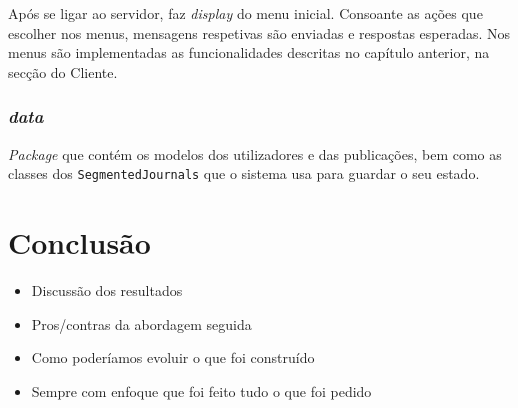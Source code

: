 \documentclass[12pt, a4paper]{report}
\begin{document}
Após se ligar ao servidor, faz \textit{display} do menu inicial.
Consoante as ações que escolher nos menus, mensagens respetivas são enviadas e respostas esperadas.
Nos menus são implementadas as funcionalidades descritas no capítulo anterior, na secção do Cliente.


\subsection{\textit{data}}
\textit{Package} que contém os modelos dos utilizadores e das publicações, bem como as classes dos \texttt{SegmentedJournals} que o sistema usa para guardar o seu estado.


\chapter{Conclusão}
\begin{itemize}
    \item Discussão dos resultados
    \item Pros/contras da abordagem seguida
    \item Como poderíamos evoluir o que foi construído
    \item Sempre com enfoque que foi feito tudo o que foi pedido
\end{itemize}
\end{document}
